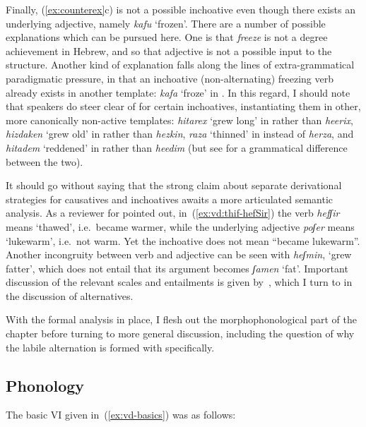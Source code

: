 \begin{exe}
\begin{xlist}
\begin{xlist}
\begin{exe}
\begin{exe}
\begin{xlist}
\begin{exe}
\begin{xlist}
\begin{exe}
\begin{xlist}
\begin{xlist}
\begin{exe}
\begin{xlist}
\begin{exe}
\begin{xlist}
\begin{exe}
\begin{xlist}
\begin{exe}
\begin{exe}
\begin{exe}
\begin{xlist}
\begin{exe}
\begin{exe}
\begin{xlist}
\begin{xlist}
\begin{exe}
\begin{xlist}
\begin{exe}
\begin{exe}
\begin{xlist}
Finally, (\ref{ex:counterex}c) is not a possible inchoative even though there exists an underlying adjective, namely \emph{kafu} `frozen'. There are a number of possible explanations which can be pursued here. One is that \emph{freeze} is not a degree achievement in Hebrew, and so that adjective is not a possible input to the structure. Another kind of explanation falls along the lines of extra-grammatical paradigmatic pressure, in that an inchoative (non-alternating) freezing verb already exists in another template: \emph{kafa} `froze' in {\tkal}. In this regard, I should note that speakers do steer clear of {\thif} for certain inchoatives, instantiating them in other, more canonically non-active templates: \emph{hitarex} `grew long' in {\thit} rather than \emph{heerix}, \emph{hizdaken} `grew old' in {\thit} rather than \emph{hezkin}, \emph{raza} `thinned' in {\tkal} instead of \emph{herza}, and \emph{hitadem} `reddened' in {\thit} rather than \emph{heedim} (but see \citealt[22]{doron03} for a grammatical difference between the two).

It should go without saying that the strong claim about separate derivational strategies for causatives and inchoatives awaits a more articulated semantic analysis. As a reviewer for \cite{kastner19tlr} pointed out, in~(\ref{ex:vd:thif-hefSir}) the verb \emph{hefʃir} means `thawed', i.e.~became warmer, while the underlying adjective \emph{poʃer} means `lukewarm', i.e.~not warm. Yet the inchoative does not mean ``became lukewarm''. Another incongruity between verb and adjective can be seen with \emph{heʃmin}, `grew fatter', which does not entail that its argument becomes \emph{ʃamen} `fat'. Important discussion of the relevant scales and entailments is given by~\cite{borer91}, which I turn to in the discussion of alternatives.

With the formal analysis in place, I flesh out the morphophonological part of the chapter before turning to more general discussion, including the question of why the labile alternation is formed with {\vd} specifically.

	
	\subsection{Phonology} \label{vd:vd:phono}
The basic VI given in~(\ref{ex:vd-basics}) was as follows:
 \begin{exe}
\ex  {\vd} {\lra} {\thif} 
 \z 


\end{exe}
\end{xlist}
\end{exe}
\end{exe}
\end{xlist}
\end{exe}
\end{xlist}
\end{xlist}
\end{exe}
\end{exe}
\end{xlist}
\end{exe}
\end{exe}
\end{exe}
\end{xlist}
\end{exe}
\end{xlist}
\end{exe}
\end{xlist}
\end{exe}
\end{xlist}
\end{xlist}
\end{exe}
\end{xlist}
\end{exe}
\end{xlist}
\end{exe}
\end{exe}
\end{xlist}
\end{xlist}
\end{exe}
